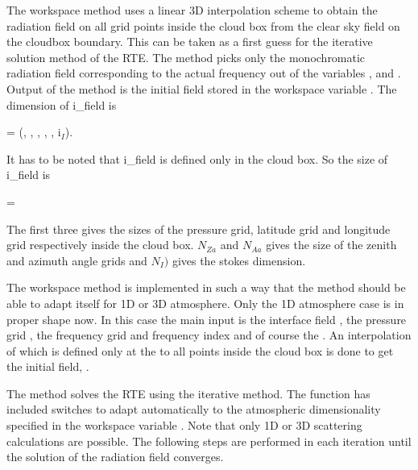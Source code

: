  
The workspace method  
uses a linear 3D interpolation scheme to obtain the 
radiation field on all grid points inside the cloud box from the clear
sky field on the cloudbox boundary.
This can be taken as a first guess for the iterative solution method
of the RTE.  The method picks only the monochromatic radiation field
corresponding to the actual frequency out of the variables
,  and
. Output of the method is the initial field 
stored in the workspace variable .  The dimension
of i\_field is
\begin{center}
  =  (\Prs, \Lat, \Lon, \ScaZa,
\ScaAa, i$_I$). 
\end{center}
It has to be noted that i\_field is defined only in the cloud box. So
the size of i\_field is 
\begin{center}
  =   \\
\end{center}

The first three gives the sizes of the pressure grid, latitude grid
and longitude grid respectively inside the cloud box. $N_{Za}$ and
$N_{Aa}$ gives the size of the zenith and azimuth angle grids and
$N_I)$ gives the stokes dimension.  

The workspace method  is implemented in such
a way that the method should be able to adapt itself for 1D or 3D
atmosphere.  Only the 1D atmosphere case is in proper shape now. In
this case the main input is the interface field ,
the pressure grid , the frequency grid
 and frequency index  and
of course the .  An interpolation of
 which is defined only at the
 to all points inside the cloud box is
done to get the initial field, . 


The method  solves the RTE using the
iterative method.  The function has
included switches to adapt automatically to the atmospheric
dimensionality specified
in the workspace variable . Note that only
1D or 3D scattering calculations are possible. 
The following steps are performed in each iteration until the solution
of the radiation field converges.

